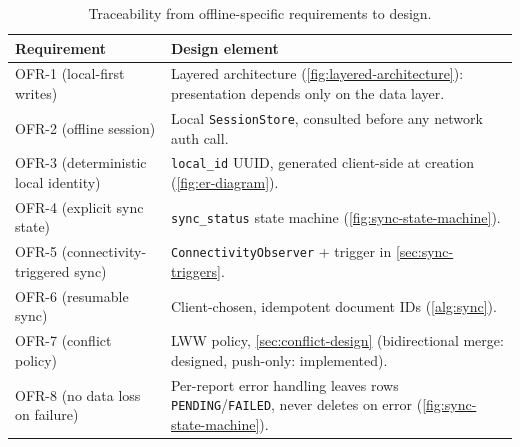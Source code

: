 \begin{table}[htbp]
\centering
\caption{Traceability from offline-specific requirements to design.}
\label{tab:traceability}
\begin{tabularx}{\textwidth}{@{}lX@{}}
\toprule
\textbf{Requirement} & \textbf{Design element} \\
\midrule
OFR-1 (local-first writes) & Layered architecture (\cref{fig:layered-architecture}): presentation depends only on the data layer. \\
OFR-2 (offline session) & Local \texttt{SessionStore}, consulted before any network auth call. \\
OFR-3 (deterministic local identity) & \texttt{local\_id} UUID, generated client-side at creation (\cref{fig:er-diagram}). \\
OFR-4 (explicit sync state) & \texttt{sync\_status} state machine (\cref{fig:sync-state-machine}). \\
OFR-5 (connectivity-triggered sync) & \texttt{ConnectivityObserver} + trigger in \cref{sec:sync-triggers}. \\
OFR-6 (resumable sync) & Client-chosen, idempotent document IDs (\cref{alg:sync}). \\
OFR-7 (conflict policy) & LWW policy, \cref{sec:conflict-design} (bidirectional merge: designed, push-only: implemented). \\
OFR-8 (no data loss on failure) & Per-report error handling leaves rows \texttt{PENDING}/\texttt{FAILED}, never deletes on error (\cref{fig:sync-state-machine}). \\
\bottomrule
\end{tabularx}
\end{table}

